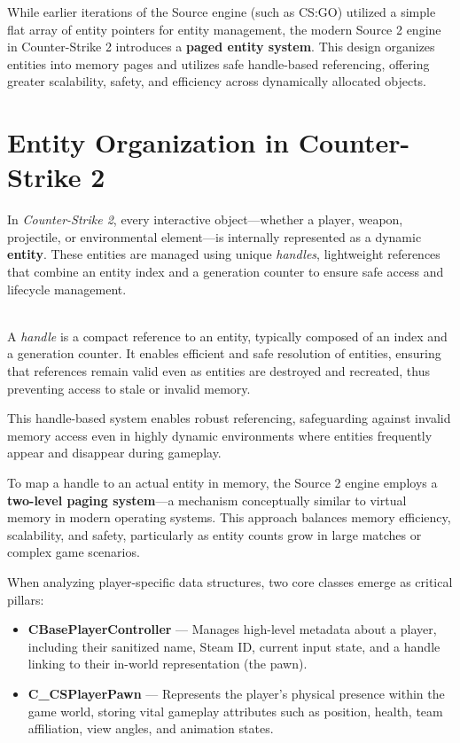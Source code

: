     
While earlier iterations of the Source engine (such as CS:GO) utilized a simple flat array of entity pointers for entity management, the modern Source 2 engine in Counter-Strike 2 introduces a \textbf{paged entity system}. This design organizes entities into memory pages and utilizes safe handle-based referencing, offering greater scalability, safety, and efficiency across dynamically allocated objects.    

\section{Entity Organization in Counter-Strike 2}

In \textit{Counter-Strike 2}, every interactive object—whether a player, weapon, projectile, or environmental element—is internally represented as a dynamic \textbf{entity}. These entities are managed using unique \textit{handles}, lightweight references that combine an entity index and a generation counter to ensure safe access and lifecycle management.

\begin{tcolorbox}[colback=gray!10, colframe=gray!50, boxrule=0pt, sharp corners, width=\linewidth, left=1mm, right=1mm, top=0.5mm, bottom=0.5mm]
 \\
A \textit{handle} is a compact reference to an entity, typically composed of an index and a generation counter. It enables efficient and safe resolution of entities, ensuring that references remain valid even as entities are destroyed and recreated, thus preventing access to stale or invalid memory.
\end{tcolorbox}


This handle-based system enables robust referencing, safeguarding against invalid memory access even in highly dynamic environments where entities frequently appear and disappear during gameplay.

To map a handle to an actual entity in memory, the Source 2 engine employs a \textbf{two-level paging system}—a mechanism conceptually similar to virtual memory in modern operating systems. This approach balances memory efficiency, scalability, and safety, particularly as entity counts grow in large matches or complex game scenarios.

When analyzing player-specific data structures, two core classes emerge as critical pillars:

\begin{itemize}
    \item \textbf{CBasePlayerController} — Manages high-level metadata about a player, including their sanitized name, Steam ID, current input state, and a handle linking to their in-world representation (the pawn).
    \item \textbf{C\_CSPlayerPawn} — Represents the player's physical presence within the game world, storing vital gameplay attributes such as position, health, team affiliation, view angles, and animation states.
\end{itemize}

